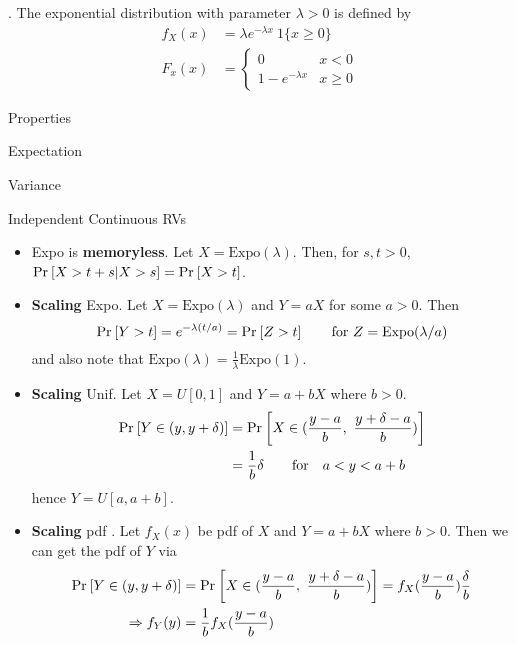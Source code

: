 \documentclass[12pt]{article}
\newcommand{\myspace}{\vspace{2\bigskipamount}}
\newcommand\p{\Needspace{12\baselineskip} \noindent}
\begin{document}
\myspace
\p {}. The exponential distribution with parameter $\lambda > 0$ is defined by 
\begin{align}
	f_X(x) &= \lambda e^{-\lambda x} ~ 1\{x \ge 0 \} \\
	F_x(x) &= \begin{cases} 0 &  x < 0 \\ 1 - e^{-\lambda x} & x \ge 0 \end{cases}
\end{align}



\p {}
\begin{compactitem}
	\item Properties
	\item Expectation
	\item Variance
	\item Independent Continuous RVs
\end{compactitem}



\myspace
\p {}
\begin{itemize}
	\item Expo is \textbf{memoryless}. Let $X = \text{Expo}(\lambda)$. Then, for $s, t > 0$, $\text{Pr}_{}\left[X > t + s | X > s\right] = \text{Pr}_{}\left[X > t\right]$.
	\item \textbf{Scaling} Expo. Let $X = \text{Expo}(\lambda)$ and $Y = aX$ for some $a > 0$. Then $$\text{Pr}_{}\left[Y > t\right] = e^{-\lambda(t/a)} = \text{Pr}_{}\left[Z > t\right] \qquad \text{for } Z = \text{Expo}(\lambda/a) $$ and also note that $\text{Expo}(\lambda) = \tfrac{1}{\lambda}\text{Expo}(1)$. 
	
	\item \textbf{Scaling} Unif. Let $X = U[0, 1]$ and $Y = a + bX$ where $b > 0$. 
	\begin{align}
		\text{Pr}_{}\left[Y \in (y, y + \delta)\right] &= \text{Pr}_{}\left[X \in (\frac{y - a}{b}, ~ \frac{y + \delta - a}{b})\right] \\
		&= \frac{1}{b} \delta \qquad \text{for} \quad a < y < a + b
	\end{align}
	hence $Y = U[a, a + b]$. 
	
	\item \textbf{Scaling} pdf \purple{[19:24]}. Let $f_X(x)$ be pdf of $X$ and $Y = a + bX$ where $b > 0$. Then we can get the pdf of $Y$ via
	\begin{align}
		\text{Pr}_{}\left[Y \in (y, y + \delta)\right] &= \text{Pr}_{}\left[X \in (\frac{y - a}{b}, ~ \frac{y + \delta - a}{b})\right] = f_X(\frac{y - a}{b})\frac{\delta}{b}\\
		\Rightarrow f_Y(y) &= \frac{1}{b}f_X(\frac{y -a}{b})
	\end{align}
\end{itemize}
\end{document}
